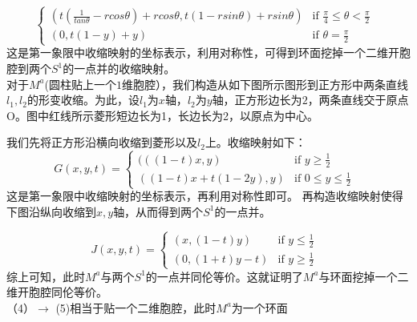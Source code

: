 \documentclass[a4paper]{ctexart}
\begin{document}
\begin{theorem}
\begin{equation}
\begin{cases}
(t(\frac{1}{tan\theta}-rcos\theta)+rcos\theta,t(1-rsin\theta)+rsin\theta) &\mbox{if $\frac{\pi}{4}\leqslant \theta < \frac{\pi}{2}$ }\\
(0,t(1-y)+y) &\mbox{if $\theta=\frac{\pi}{2}$}
\end{cases}
\end{equation}
这是第一象限中收缩映射的坐标表示，利用对称性，可得到环面挖掉一个二维开胞腔到两个$S^1$的一点并的收缩映射。\\
对于$M^a$(圆柱贴上一个$1$维胞腔），我们构造从如下图所示图形到正方形中两条直线$l_1,l_2$的形变收缩。为此，设$l_1$为$x$轴，$l_2$为$y$轴，正方形边长为$2$，两条直线交于原点O。图中红线所示菱形短边长为1，长边长为2，以原点为中心。
\begin{figure}[H]
\small
\centering
{}
\label{2}
\end{figure}
我们先将正方形沿横向收缩到菱形以及$l_2$上。收缩映射如下：
\begin{equation}
G(x,y,t)=
\begin{cases}
(((1-t)x,y) &\mbox{if $y \geqslant \frac{1}{2}$}\\
((1-t)x+t(1-2y),y) &\mbox{if $0\leqslant y\leqslant \frac{1}{2}$ }
\end{cases}
\end{equation}
这是第一象限中收缩映射的坐标表示，再利用对称性即可。
再构造收缩映射使得下图沿纵向收缩到$x,y$轴，从而得到两个$S^1$的一点并。
\begin{figure}[H]
\small
\centering
{}
\label{2}
\end{figure}
\begin{equation}
J(x,y,t)=
\begin{cases}
(x,(1-t)y) &\mbox{if $y \leqslant \frac{1}{2}$}\\
(0,(1+t)y-t) &\mbox{if $y\geqslant \frac{1}{2}$ }
\end{cases}
\end{equation}
综上可知，此时$M^a$与两个$S^1$的一点并同伦等价。这就证明了$M^a$与环面挖掉一个二维开胞腔同伦等价。\\
（4）$\to$ (5)相当于贴一个二维胞腔，此时$M^a$为一个环面\\

\end{theorem}
\end{document}
